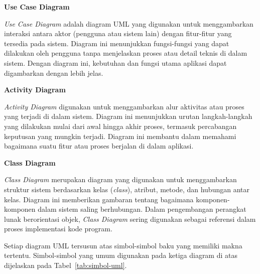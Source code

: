 \textbf{Use Case Diagram}

\textit{Use Case Diagram} adalah diagram UML yang digunakan untuk menggambarkan interaksi antara aktor (pengguna atau sistem lain) dengan fitur-fitur yang tersedia pada sistem.
Diagram ini menunjukkan fungsi-fungsi yang dapat dilakukan oleh pengguna tanpa menjelaskan proses atau detail teknis di dalam sistem.
Dengan diagram ini, kebutuhan dan fungsi utama aplikasi dapat digambarkan dengan lebih jelas.

\textbf{Activity Diagram}

\textit{Activity Diagram} digunakan untuk menggambarkan alur aktivitas atau proses yang terjadi di dalam sistem.
Diagram ini menunjukkan urutan langkah-langkah yang dilakukan mulai dari awal hingga akhir proses, termasuk percabangan keputusan yang mungkin terjadi.
Diagram ini membantu dalam memahami bagaimana suatu fitur atau proses berjalan di dalam aplikasi.

\textbf{Class Diagram}

\textit{Class Diagram} merupakan diagram yang digunakan untuk menggambarkan struktur sistem berdasarkan kelas (\textit{class}), atribut, metode, dan hubungan antar kelas.
Diagram ini memberikan gambaran tentang bagaimana komponen-komponen dalam sistem saling berhubungan.
Dalam pengembangan perangkat lunak berorientasi objek, \textit{Class Diagram} sering digunakan sebagai referensi dalam proses implementasi kode program.

Setiap diagram UML tersusun atas simbol-simbol baku yang memiliki makna tertentu.
Simbol-simbol yang umum digunakan pada ketiga diagram di atas dijelaskan pada Tabel~\ref{tab:simbol-uml}.

